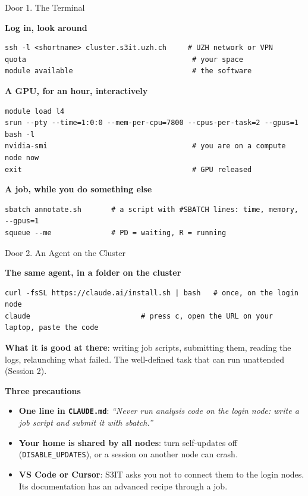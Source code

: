 \begin{frame}[fragile]{Door 1. The Terminal}

\small
\textbf{Log in, look around}
{\scriptsize
\begin{verbatim}
ssh -l <shortname> cluster.s3it.uzh.ch     # UZH network or VPN
quota                                       # your space
module available                            # the software
\end{verbatim}}

\textbf{A GPU, for an hour, interactively}
{\scriptsize
\begin{verbatim}
module load l4
srun --pty --time=1:0:0 --mem-per-cpu=7800 --cpus-per-task=2 --gpus=1 bash -l
nvidia-smi                                  # you are on a compute node now
exit                                        # GPU released
\end{verbatim}}

\textbf{A job, while you do something else}
{\scriptsize
\begin{verbatim}
sbatch annotate.sh       # a script with #SBATCH lines: time, memory, --gpus=1
squeue --me              # PD = waiting, R = running
\end{verbatim}}

\end{frame}

\begin{frame}[fragile]{Door 2. An Agent on the Cluster}

\small
\textbf{The same agent, in a folder on the cluster}
{\scriptsize
\begin{verbatim}
curl -fsSL https://claude.ai/install.sh | bash   # once, on the login node
claude                          # press c, open the URL on your laptop, paste the code
\end{verbatim}}

\vspace{0.1cm}

\textbf{What it is good at there}: writing job scripts, submitting them, reading the logs, relaunching what failed. The well-defined task that can run unattended (Session 2).

\vspace{0.2cm}

\textbf{Three precautions}
\begin{itemize}
    \setlength{\itemsep}{3pt}
    \item \textbf{One line in \texttt{CLAUDE.md}}: \textit{``Never run analysis code on the login node: write a job script and submit it with sbatch.''}
    \item \textbf{Your home is shared by all nodes}: turn self-updates off (\texttt{DISABLE\_UPDATES}), or a session on another node can crash.
    \item \textbf{VS Code or Cursor}: S3IT asks you not to connect them to the login nodes. Its documentation has an advanced recipe through a job.
\end{itemize}

\end{frame}

